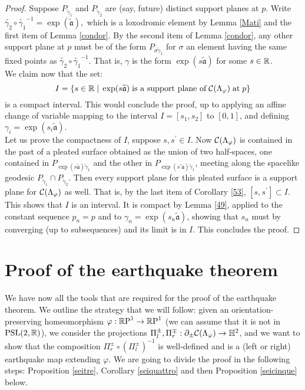 \begin{proof}
Suppose $P_{\widetilde{\gamma}_1}$ and $P_{\widetilde{\gamma}_2}$ are (say, future) distinct support planes at $p$. Write $\widetilde{\gamma_2}\circ\widetilde{\gamma_1}^{-1}=\exp(\widetilde{\mathfrak{a}}),$ which is a loxodromic element by Lemma \ref{Mati} and the first item of Lemma \ref{condor}. By the second item of Lemma \ref{condor}, any other support plane at $p$ must be of the form $P_{\sigma\widetilde{\gamma}_1}$ for $\sigma$ an element having the same fixed points as $\widetilde{\gamma_2}\circ\widetilde{\gamma_1}^{-1}$. That is, $\gamma$ is the form $\exp(s\widetilde{\mathfrak{a}})$ for some $s\in\R$.\\
We claim now that the set: 
\[
    I=\{s\in\R\;|\;\exp(s\widetilde{\mathfrak{a}})\;\text{is a support plane of}\;\CF\;\text{at}\;p\}
\]
is a compact interval. This would conclude the proof, up to applying an affine change of variable mapping to the interval $I=[s_1,s_2]$ to $[0,1]$, and defining $\gamma_i=\exp(s_i\widetilde{\mathfrak{a}}).$\\
Let us prove the compactness of $I$, suppose $s,s^{\prime} \in I$. Now $\CF$ is contained in the past of a pleated surface obtained as the union of two half-spaces, one contained in $P_{\exp(s\widetilde{\mathfrak{a}})\widetilde{\gamma}_1}$ and the other in $P_{\exp(s^{\prime}\widetilde{\mathfrak{a}})\widetilde{\gamma}_1}$, meeting along the spacelike geodesic $P_{\widetilde{\gamma}_1}\cap P_{\widetilde{\gamma}_2}$. Then every support plane for this pleated surface is a support plane for $\CF$ as well. That is, by the last item of Corollary \ref{53}, $[s,s^{\prime}]\subset I$. This shows that $I$ is an interval. It is compact by Lemma \ref{49}, applied to the constant sequence $p_n=p$ and to $\gamma_n=\exp(s_n\widetilde{\mathfrak{a}})$, showing that $s_n$ must by converging (up to subsequences) and its limit is in $I$. This concludes the proof.  

\end{proof}

\section{Proof of the earthquake theorem}

We have now all the tools that are required for the proof of the earthquake theorem. We outline the strategy that we will follow: given an orientation-preserving homeomorphism $\varphi:\S\to\S$ (we can assume that it is not in $\PSL$), we consider the projections $\Pi_l^\pm,\Pi_r^\mp:\partial_\pm\CF\to\H^2$, and we want to show that the composition $\Pi_r^\pm\circ(\Pi_l^\pm)^{-1}$  is well-defined and is a (left or right) earthquake map extending $\varphi$. We are going to divide the proof in the following steps: Proposition \ref{seitre}, Corollary \ref{seiquattro} and then Proposition \ref{seicinque} below.

